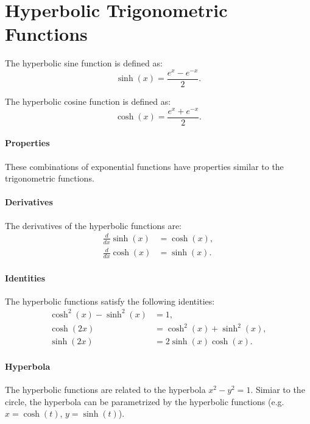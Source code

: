 \documentclass[11pt]{report}
\begin{document}
\section{Hyperbolic Trigonometric Functions}
\begin{definition}
    The hyperbolic sine function is defined as:
    \begin{equation} \sinh(x) = \frac{e^x - e^{-x}}{2}. \end{equation}
\end{definition}
\begin{definition}
    The hyperbolic cosine function is defined as:
    \begin{equation}  \cosh(x) = \frac{e^x + e^{-x}}{2}. \end{equation}
\end{definition}
\paragraph{Properties} These combinations of exponential functions have properties similar to the trigonometric functions.
\paragraph{Derivatives} The derivatives of the hyperbolic functions are:
\begin{align}
    \frac{d}{dx} \sinh(x) &= \cosh(x), \\
    \frac{d}{dx} \cosh(x) &= \sinh(x).
\end{align}
\paragraph{Identities} The hyperbolic functions satisfy the following identities:
\begin{align}
    \cosh^2(x) - \sinh^2(x) &= 1, \\
    \cosh(2x) &= \cosh^2(x) + \sinh^2(x), \\
    \sinh(2x) &= 2\sinh(x)\cosh(x).
\end{align}
\paragraph{Hyperbola} The hyperbolic functions are related to the hyperbola $x^2 - y^2 = 1$. Simiar to the circle, the hyperbola can be parametrized by the hyperbolic functions (e.g. $x = \cosh(t)$, $y = \sinh(t)$).
\end{document}

